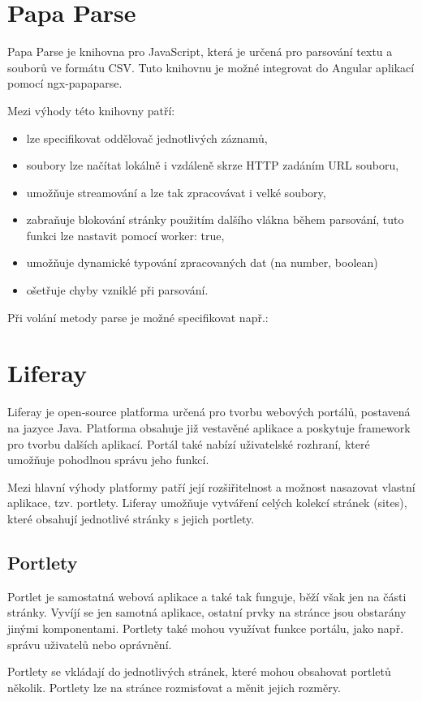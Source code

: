 \documentclass[
  digital, %
  oneside, %
  table,   %
  nolof,     %
  nolot,     %
]{fithesis3}
\begin{document}
\section{Papa Parse}
Papa Parse je knihovna pro JavaScript, která je určená pro parsování textu a souborů ve formátu CSV. Tuto knihovnu je možné integrovat do Angular aplikací pomocí ngx-papaparse.\par
Mezi výhody této knihovny patří: \cite{papa}
\begin{itemize}
  \item lze specifikovat oddělovač jednotlivých záznamů,
  \item soubory lze načítat lokálně i vzdáleně skrze HTTP zadáním URL souboru,
  \item umožňuje streamování a lze tak zpracovávat i velké soubory,
  \item zabraňuje blokování stránky použitím dalšího vlákna během parsování, tuto funkci lze nastavit pomocí worker: true,
  \item umožňuje dynamické typování zpracovaných dat (na number, boolean)
  \item ošetřuje chyby vzniklé při parsování.
\end{itemize}

Při volání metody parse je možné specifikovat např.:

\section{Liferay} \label{liferay}
Liferay je open-source platforma určená pro tvorbu webových portálů, postavená na jazyce Java. Platforma obsahuje již vestavěné aplikace a poskytuje framework pro tvorbu dalších aplikací. Portál také nabízí uživatelské rozhraní, které umožňuje pohodlnou správu jeho funkcí.\par
Mezi hlavní výhody platformy patří její rozšiřitelnost a možnost nasazovat vlastní aplikace, tzv. portlety. Liferay umožňuje vytváření celých kolekcí stránek (sites), které obsahují jednotlivé stránky s jejich portlety.\cite{liferay}
\subsection{Portlety}
Portlet je samostatná webová aplikace a také tak funguje, běží však jen na části stránky. Vyvíjí se jen samotná aplikace, ostatní prvky na stránce jsou obstarány jinými komponentami. Portlety také mohou využívat funkce portálu, jako např. správu uživatelů nebo oprávnění.\par
Portlety se vkládají do jednotlivých stránek, které mohou obsahovat portletů několik. Portlety lze na stránce rozmisťovat a měnit jejich rozměry. \cite{liferay}
\end{document}
